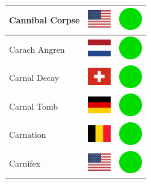 \documentclass[12pt, a4paper, twoside]{report}
\begin{document}
\begin{center}
\begin{longtable}{|p{5cm}|p{2cm}|p{2cm}|}
 Cannibal Corpse                                            & \includegraphics[width=1cm]{../img/flags/us} &   \includegraphics[width=1cm]{../likes/y} \\ \hline
 Carach Angren                                              & \includegraphics[width=1cm]{../img/flags/nl} &   \includegraphics[width=1cm]{../likes/y} \\ \hline
 Carnal Decay                                               & \includegraphics[width=1cm]{../img/flags/ch} &   \includegraphics[width=1cm]{../likes/y} \\ \hline
 Carnal Tomb                                                & \includegraphics[width=1cm]{../img/flags/de} &   \includegraphics[width=1cm]{../likes/y} \\ \hline
 Carnation                                                  & \includegraphics[width=1cm]{../img/flags/be} &   \includegraphics[width=1cm]{../likes/y} \\ \hline
 Carnifex                                                   & \includegraphics[width=1cm]{../img/flags/us} &   \includegraphics[width=1cm]{../likes/y} \\ \hline

\end{longtable}
\end{center}
\end{document}
